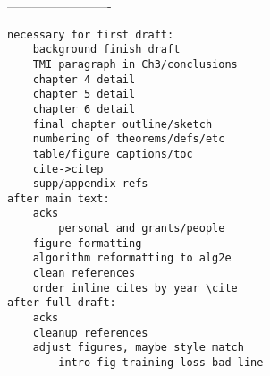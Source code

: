 -------------------------

\begin{verbatim}
necessary for first draft:
	background finish draft
	TMI paragraph in Ch3/conclusions
	chapter 4 detail
	chapter 5 detail
	chapter 6 detail
	final chapter outline/sketch
    numbering of theorems/defs/etc
	table/figure captions/toc
	cite->citep
	supp/appendix refs
after main text:
    acks
    	personal and grants/people
    figure formatting
    algorithm reformatting to alg2e
    clean references
    order inline cites by year \cite
after full draft:
	acks
	cleanup references
	adjust figures, maybe style match
		intro fig training loss bad line
\end{verbatim}


